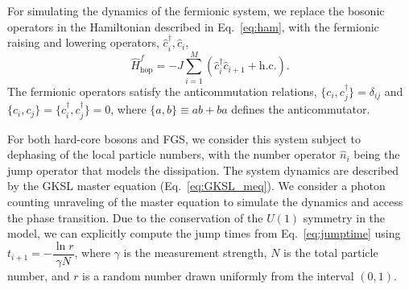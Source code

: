 For simulating the dynamics of the fermionic system, we replace the bosonic operators in the Hamiltonian described in Eq.~\ref{eq:ham}, with the fermionic raising and lowering operators, $\hat{c}^\dagger_i, \hat{c}_i$,
\begin{equation}
\hat{H}^f_\text{hop} =-J \sum\limits_{i=1}^{M} ( \hat{c}^{\dagger}_i \hat{c}_{i+1} + \textrm{h.c.}).
\end{equation}
The fermionic operators satisfy the anticommutation relations, $\{c_i,c_j^\dagger\} = \delta_{ij}$ and $\{c_i,c_j\}= \{c_i^\dagger, c_j^\dagger\} = 0$, where $\{a,b\} \equiv ab + ba$ defines the anticommutator.

For both hard-core bosons and FGS, we consider this system subject to dephasing of the local particle numbers, with the number operator $\hat{n}_i$ being the jump operator that models the dissipation. The system dynamics are described by the GKSL master equation (Eq.~\ref{eq:GKSL_meq}). We consider a photon counting unraveling of the master equation to simulate the dynamics and access the phase transition. Due to the conservation of the $U(1)$ symmetry in the model, we can explicitly compute the jump times from Eq.~\ref{eq:jumptime} using $t_{i+1} = -\dfrac{\ln{r}}{\gamma N}$, where $\gamma$ is the measurement strength, $N$ is the total particle number, and $r$ is a random number drawn uniformly from the interval $(0,1)$.

